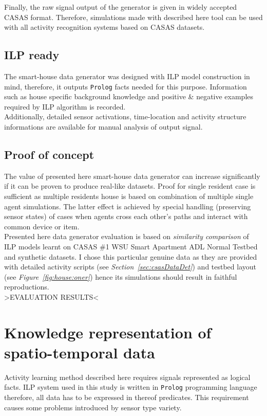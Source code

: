 \documentclass[11pt, a4paper, pdflatex, leqno, twoside, openright]{report}
\begin{document}
Finally, the raw signal output of the generator is given in widely accepted CASAS format. Therefore, simulations made with described here tool can be used with all activity recognition systems based on CASAS datasets.

    \subsection{ILP ready}
The smart-house data generator was designed with ILP model construction in mind, therefore, it outputs \texttt{Prolog} facts needed for this purpose. Information such as house specific background knowledge and positive \& negative examples required by ILP algorithm is recorded.\\
Additionally, detailed sensor activations, time-location and activity structure informations are available for manual analysis of output signal.

    \subsection{Proof of concept}
The value of presented here smart-house data generator can increase significantly if it can be proven to produce real-like datasets. Proof for single resident case is sufficient as multiple residents house is based on combination of multiple single agent simulations. The latter effect is achieved by special handling (preserving sensor states) of cases when agents cross each other's paths and interact with common device or item.\\

Presented here data generator evaluation is based on \emph{similarity comparison} of ILP models learnt on CASAS \#1 WSU Smart Apartment ADL Normal Testbed and synthetic datasets. I chose this particular genuine data as they are provided with detailed activity scripts (see \emph{Section~\ref{sec:csasDataDet}}) and testbed layout (see \emph{Figure~\ref{fig:house:oner}}) hence its simulations should result in faithful reproductions.\\

>EVALUATION RESULTS<

  \section{Knowledge representation of spatio-temporal data}
Activity learning method described here requires signals represented as logical facts. ILP system used in this study is written in \texttt{Prolog} programming language therefore, all data has to be expressed in thereof predicates. This requirement causes some problems introduced by sensor type variety.\\
\end{document}

